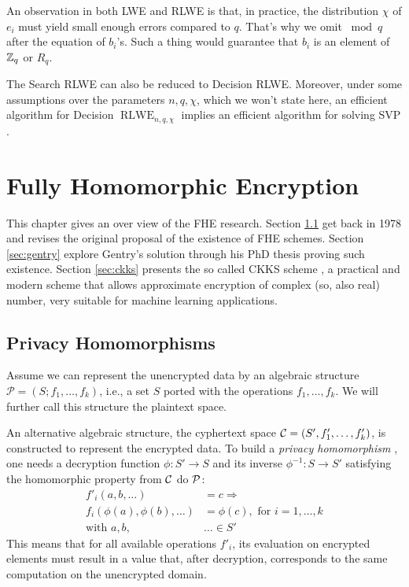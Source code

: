 An observation in both LWE and RLWE is that, in practice, the distribution $\chi$ of $e_i$ must yield small enough errors compared to $q$. That's why we omit $\bmod q$ after the equation of $b_i$'s. Such a thing would guarantee that $b_i$ is an element of $\mathbb{Z}_q$ or $R_q$.

The Search RLWE can also be reduced to Decision RLWE. Moreover, under some assumptions over the parameters $n,q,\chi$, which we won't state here, an efficient algorithm for Decision $\operatorname{RLWE}_{n,q,\chi}$ implies an efficient algorithm for solving SVP \cite{lyubashevsky10}.



\chapter{Fully Homomorphic Encryption}
This chapter gives an over view of the FHE research. Section \ref{sec:privhom} get back in 1978 and revises the original proposal of the existence of FHE schemes. Section \ref{sec:gentry} explore Gentry's solution through his PhD thesis \cite{gentry2009fully} proving such existence. Section \ref{sec:ckks} presents the so called CKKS scheme \cite{ckks17}, a practical and modern scheme that allows approximate encryption of complex (so, also real) number, very suitable for machine learning applications. 

\section{Privacy Homomorphisms}
\label{sec:privhom}
Assume we can represent the unencrypted data by an algebraic structure $\mathcal P= (S;f_1,\ldots,f_k)$, i.e., a set $S$ ported with the operations $f_1,\ldots,f_k$. We will further call this structure the plaintext space.

An alternative algebraic structure, the cyphertext space $\mathcal C=(S',f'_1,\ldots,f'_k)$, is constructed to represent the encrypted data. To build a \textit{privacy homomorphism} \cite{Rivest1978},  one needs a decryption function $\phi:S'\to S$ and its inverse $\phi^{-1}:S\to S'$ satisfying the homomorphic property from $\mathcal C$ do $\mathcal P$:
\begin{align}
    \label{privhom}
    f'_i(a,b,\ldots)&=c\Rightarrow\nonumber\\ f_i(\phi(a),\phi(b),\ldots)&=\phi(c),\text{ for } i=1,\ldots,k\\
    \text{with }a,b,&\ldots\in S'\nonumber
\end{align}
This means that for all available operations $f'_i$, its evaluation on encrypted elements must result in a value that, after decryption, corresponds to the same computation on the unencrypted domain.

